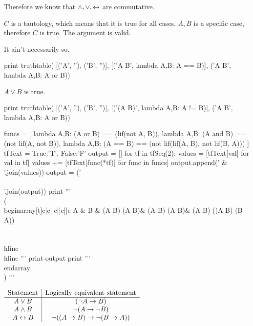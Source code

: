 Therefore we know that \(\land, \lor, \leftrightarrow\) are commutative.

\setcounter{enumi}{17}

\item $C$ is a tautology, which means that it is true for all cases. ${A, B}$ is a specific case, therefore $C$ is true. The argument is valid.

\item
It ain't necessarily so.

\begin{python}[truth.py]
print truthtable(
[('A', ''), ('B', '')],
[('A \liff B', lambda A,B: A == B)], ('A \lor B', lambda A,B: A or B))
\end{python}

\item
\( A \lor B \) is true.

\begin{python}[truth.py]
print truthtable(
[('A', ''), ('B', '')],
[('\lnot (A \liff B)', lambda A,B: A != B)], ('A \lor B', lambda A,B: A or B))
\end{python}

\item

\begin{python}[truth.py]
funcs = [
    lambda A,B: (A or B) == (lif(not A, B)),
    lambda A,B: (A and B) == (not lif(A, not B)),
    lambda A,B: (A == B) == (not lif(lif(A, B), not lif(B, A)))
]
tfText = {True:'T', False:'F'}
output = []
for tf in tfSeq(2):
    values = [tfText[val] for val in tf]
    values += [tfText[func(*tf)] for func in funcs]
    output.append(' & '.join(values))
output = (' \\\\\n'.join(output))
print '''
\\(
\\begin{array}[t]{c|c||c||c||c}
A & B &
(A \land B) \liff (\lnot A \lif B)&
(A \lor B) \liff \lnot (A \lif \lnot B)&
(A \liff B) \liff \lnot ((A \lif B) \lif \lnot (B \lif A)) \\\\
\\hline
\\hline
'''
print output
print '''
\\end{array}
\\)
'''
\end{python}

\(
\begin{array}{c|c}
\textrm{Statement} & \textrm{Logically equivalent statement} \\
\hline
A \lor B & (\lnot A \rightarrow B) \\
A \land B & \lnot (A \rightarrow \lnot B) \\
A \leftrightarrow B & \lnot ((A \rightarrow B) \rightarrow \lnot (B \rightarrow A)) \\
\end{array}
\)

